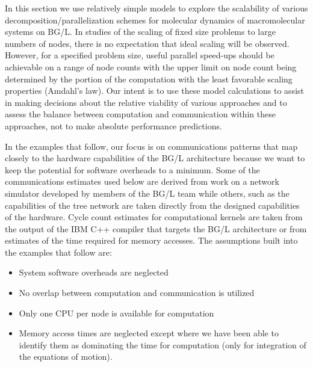 \documentclass[doublespacing]{elsart}
\begin{document}
In this section we use relatively simple models to explore the
scalability of various decomposition/parallelization schemes for
molecular dynamics of macromolecular systems on BG/L.  In studies of
the scaling of fixed size problems to large numbers of nodes, there is
no expectation that ideal scaling will be observed.\cite{Taylor:1997}
However, for a specified problem size, useful parallel speed-ups
should be achievable on a range of node counts with the upper limit on
node count being determined by the portion of the computation with the
least favorable scaling properties (Amdahl's law).  Our intent is to
use these model calculations to assist in making decisions about the
relative viability of various approaches and to assess the balance
between computation and communication within these approaches, {\em}
not to make absolute performance predictions.

In the examples that follow, our focus is on communications patterns
that map closely to the hardware capabilities of the BG/L architecture
because we want to keep the potential for software overheads to a
minimum.  Some of the communications estimates used below are derived
from work on a network simulator developed by members of the BG/L team
while others, such as the capabilities of the tree network are taken
directly from the designed capabilities of the
hardware.\cite{bgl_sc:2002} Cycle count estimates for computational
kernels are taken from the output of the IBM C++ compiler that targets
the BG/L architecture or from estimates of the time required for
memory accesses.  The assumptions built into the examples that follow
are:
\begin{itemize}
\item System software overheads are neglected
\item No overlap between computation and communication is utilized
\item Only one CPU per node is available for computation
\item Memory access times are neglected except where we have been able
  to identify them as dominating the time for computation (only for
  integration of the equations of motion).
\end{itemize}
\end{document}
